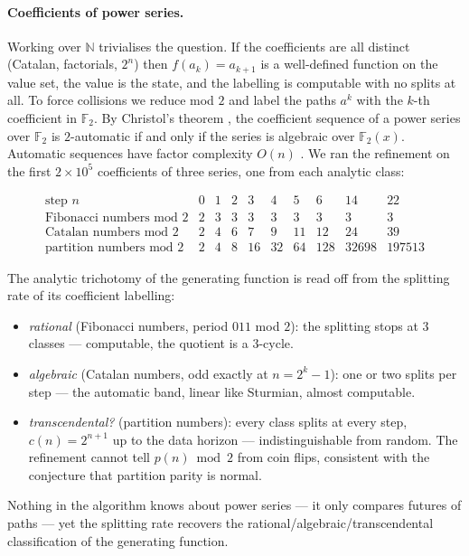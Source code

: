 \documentclass[11pt, a4paper]{article}
\theoremstyle{definition}
\theoremstyle{plain}
\begin{document}
\paragraph{Coefficients of power series.}
Working over $\mathbb{N}$ trivialises the question.  If the
coefficients are all distinct (Catalan, factorials, $2^n$) then
$f(a_k) = a_{k+1}$ is a well-defined function on the value set, the
value is the state, and the labelling is computable with no splits
at all.  To force collisions we reduce mod $2$ and label the paths
$a^k$ with the $k$-th coefficient in $\mathbb{F}_2$.  By Christol's
theorem \cite{christol}, the coefficient sequence of a power series
over $\mathbb{F}_2$ is $2$-automatic if and only if the series is
algebraic over $\mathbb{F}_2(x)$.  Automatic sequences have factor
complexity $O(n)$ \cite{cobham, alloucheshallit}.  We ran the
refinement on the first
$2 \times 10^5$ coefficients of three series, one from each analytic
class:

\[
\begin{array}{r|ccccccc|cc}
  \text{step } n & 0 & 1 & 2 & 3 & 4 & 5 & 6 & 14 & 22 \\
  \hline
  \text{Fibonacci numbers mod } 2 & 2 & 3 & 3 & 3 & 3 & 3 & 3 & 3 & 3 \\
  \text{Catalan numbers mod } 2   & 2 & 4 & 6 & 7 & 9 & 11 & 12 & 24 & 39 \\
  \text{partition numbers mod } 2 & 2 & 4 & 8 & 16 & 32 & 64 & 128
    & 32698 & 197513
\end{array}
\]

The analytic trichotomy of the generating function is read off from
the splitting rate of its coefficient labelling:
\begin{itemize}
  \item \emph{rational} (Fibonacci numbers, period $011$ mod $2$):
        the splitting stops at $3$ classes --- computable, the
        quotient is a $3$-cycle.
  \item \emph{algebraic} (Catalan numbers, odd exactly at
        $n = 2^k - 1$): one or two splits per step --- the automatic
        band, linear like Sturmian, almost computable.
  \item \emph{transcendental?} (partition numbers): every class
        splits at every step, $c(n) = 2^{n+1}$ up to the data
        horizon --- indistinguishable from random.  The refinement
        cannot tell $p(n) \bmod 2$ from coin flips, consistent with
        the conjecture that partition parity is normal.
\end{itemize}
Nothing in the algorithm knows about power series --- it only
compares futures of paths --- yet the splitting rate recovers the
rational/algebraic/transcendental classification of the generating
function.
\end{document}
